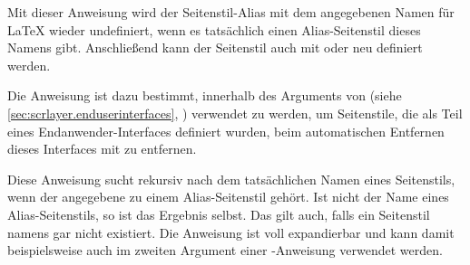 \begin{Declaration}
\end{Declaration}
%
%
Mit dieser Anweisung wird der Seitenstil-Alias mit dem angegebenen Namen
 für \LaTeX{} wieder undefiniert, wenn es
tatsächlich einen Alias-Seitenstil dieses Namens gibt. Anschließend kann der
Seitenstil auch mit  oder
 neu definiert werden.

Die Anweisung ist dazu bestimmt, innerhalb des Arguments  von
 (siehe
\autoref{sec:scrlayer.enduserinterfaces},
) verwendet zu
werden, um Seitenstile, die als Teil eines Endanwender-Interfaces definiert
wurden, beim automatischen Entfernen dieses Interfaces mit zu entfernen.%
\EndIndexGroup


\begin{Declaration}
\end{Declaration}
%
%
Diese Anweisung sucht rekursiv nach dem tatsächlichen Namen eines
Seitenstils, wenn der angegebene  zu einem
Alias-Seitenstil gehört. Ist  nicht der Name eines
Alias-Seitenstils, so ist das Ergebnis  selbst. Das
gilt auch, falls ein Seitenstil namens  gar nicht
existiert. Die Anweisung ist voll expandierbar und kann damit beispielsweise
auch im zweiten Argument einer -Anweisung verwendet werden.%
\EndIndexGroup


